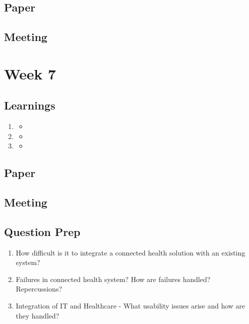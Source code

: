 \section{Paper}

\section{Meeting}

\chapter{Week 7}

\section{Learnings}
\begin{enumerate}
\item
\begin{itemize}
\item
\end{itemize}
\item
\begin{itemize}
\item
\end{itemize}
\item
\begin{itemize}
\item
\end{itemize}
\end{enumerate}

\section{Paper}

\section{Meeting}

\section{Question Prep}
\begin{enumerate}
\item How difficult is it to integrate a connected health solution with an existing system?
\item Failures in connected health system? How are failures handled? Repercussions?
\item Integration of IT and Healthcare - What usability issues arise and how are they handled?
\end{enumerate}

